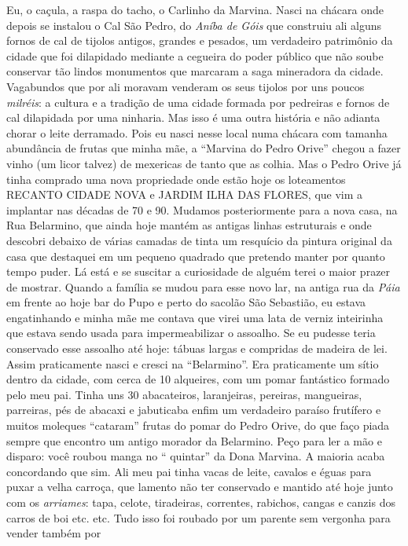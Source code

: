 \documentclass[12pt,brazil,]{book}
\begin{document}
Eu, o caçula, a raspa do tacho, o Carlinho da Marvina. Nasci na chácara
onde depois se instalou o Cal São Pedro, do \emph{Aníba de Góis} que
construiu ali alguns fornos de cal de tijolos antigos, grandes e
pesados, um verdadeiro patrimônio da cidade que foi dilapidado mediante
a cegueira do poder público que não soube conservar tão lindos
monumentos que marcaram a saga mineradora da cidade. Vagabundos que por
ali moravam venderam os seus tijolos por uns poucos \emph{milréis}: a
cultura e a tradição de uma cidade formada por pedreiras e fornos de cal
dilapidada por uma ninharia. Mas isso é uma outra história e não adianta
chorar o leite derramado. Pois eu nasci nesse local numa chácara com
tamanha abundância de frutas que minha mãe, a ``Marvina do Pedro Orive''
chegou a fazer vinho (um licor talvez) de mexericas de tanto que as
colhia. Mas o Pedro Orive já tinha comprado uma nova propriedade onde
estão hoje os loteamentos RECANTO CIDADE NOVA e JARDIM ILHA DAS FLORES,
que vim a implantar nas décadas de 70 e 90. Mudamos posteriormente para
a nova casa, na Rua Belarmino, que ainda hoje mantém as antigas linhas
estruturais e onde descobri debaixo de várias camadas de tinta um
resquício da pintura original da casa que destaquei em um pequeno
quadrado que pretendo manter por quanto tempo puder. Lá está e se
suscitar a curiosidade de alguém terei o maior prazer de mostrar. Quando
a família se mudou para esse novo lar, na antiga rua da \emph{Páia} em
frente ao hoje bar do Pupo e perto do sacolão São Sebastião, eu estava
engatinhando e minha mãe me contava que virei uma lata de verniz
inteirinha que estava sendo usada para impermeabilizar o assoalho. Se eu
pudesse teria conservado esse assoalho até hoje: tábuas largas e
compridas de madeira de lei. Assim praticamente nasci e cresci na
``Belarmino''. Era praticamente um sítio dentro da cidade, com cerca de
10 alqueires, com um pomar fantástico formado pelo meu pai. Tinha uns 30
abacateiros, laranjeiras, pereiras, mangueiras, parreiras, pés de
abacaxi e jabuticaba enfim um verdadeiro paraíso frutífero e muitos
moleques ``cataram'' frutas do pomar do Pedro Orive, do que faço piada
sempre que encontro um antigo morador da Belarmino. Peço para ler a mão
e disparo: você roubou manga no `` quintar'' da Dona Marvina. A maioria
acaba concordando que sim. Ali meu pai tinha vacas de leite, cavalos e
éguas para puxar a velha carroça, que lamento não ter conservado e
mantido até hoje junto com os \emph{arriames}: tapa, celote, tiradeiras,
correntes, rabichos, cangas e canzis dos carros de boi etc. etc. Tudo
isso foi roubado por um parente sem vergonha para vender também por
\end{document}
